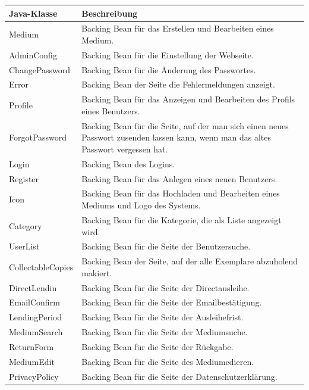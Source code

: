 \documentclass{article}
\begin{document}
 \begin{center}
    \begin{table}
        \begin{tabular} { |p{}|p{}| }
            \hline
            Java-Klasse & Beschreibung  \\
            \hline\hline
            Medium & Backing Bean für das Erstellen und Bearbeiten eines Medium. \\
            \hline
            AdminConfig & Backing Bean für die Einstellung der Webseite. \\
            \hline
            ChangePassword & Backing Bean für die Änderung des Passwortes. \\
            \hline
            Error & Backing Bean der Seite die Fehlermeldungen anzeigt.\\
            \hline
            Profile & Backing Bean für das Anzeigen und Bearbeiten des Profils eines Benutzers. \\
            \hline
            ForgotPassword & Backing Bean für die Seite, auf der man sich einen neues Passwort zusenden lassen kann, wenn man das altes Passwort vergessen hat. \\
             \hline
            Login & Backing Bean des Logins. \\
             \hline
            Register & Backing Bean für das Anlegen eines neuen Benutzers. \\
            \hline
            Icon & Backing Bean für das Hochladen und Bearbeiten eines Mediums und Logo des Systems. \\
            \hline
            Category & Backing Bean für die Kategorie, die als Liste angezeigt wird. \\
            \hline
            UserList & Backing Bean für die Seite der Benutzersuche. \\
            \hline
            CollectableCopies & Backing Bean der Seite, auf der alle Exemplare abzuholend makiert. \\
            \hline
            DirectLendin & Backing Bean für die Seite der Directausleihe. \\
             \hline
            EmailConfirm & Backing Bean für die Seite der Emailbestätigung. \\
             \hline
            LendingPeriod & Backing Bean für die Seite der Ausleihefrist. \\
             \hline
            MediumSearch & Backing Bean für die Seite der Mediumsuche. \\
             \hline
            ReturnForm & Backing Bean für die Seite der Rückgabe. \\
             \hline
            MediumEdit & Backing Bean für die Seite des Mediumedieren. \\
             \hline
            PrivacyPolicy & Backing Bean für die Seite der Datenschutzerklärung. \\
            \hline
        \end{tabular}
        \end{table}
        \end{center}
       
\end{document}
